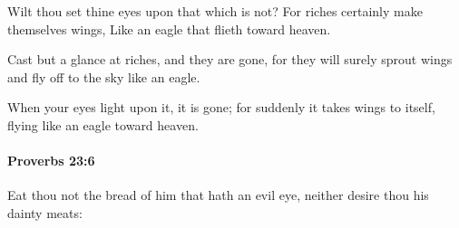 			\begin{versebox}
					\item[BHS] 
					\item[ASV] Wilt thou set thine eyes upon that which is not? For riches certainly make themselves wings, Like an eagle that flieth toward heaven.
					\item[NIV] Cast but a glance at riches, and they are gone, for they will surely sprout wings and fly off to the sky like an eagle.
					\item[NRSV] When your eyes light upon it, it is gone; for suddenly it takes wings to itself, flying like an eagle toward heaven.
			\end{versebox}

		\paragraph{Proverbs 23:6} %
			\label{PROVERBS-23-6}

			Eat thou not the bread of him that hath an evil eye, neither desire thou his dainty meats:

